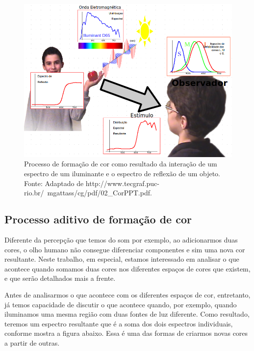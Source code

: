 \begin{figure}[!htb]
     \centering
     \includegraphics[scale=0.9]{img/what_is_color.png}
     \caption{Processo de formação de cor como resultado da interação de um
espectro de um iluminante e o espectro de reflexão de um objeto. Fonte:
Adaptado de 
{http://www.tecgraf.puc-rio.br/~mgattass/cg/pdf/02_CorPPT.pdf}.}
     \label{fig:what_is_color}
\end{figure}

\subsection{Processo aditivo de formação de cor}
\par
Diferente da percepção que temos do som por exemplo, ao adicionarmos duas cores,
o olho humano não consegue diferenciar componentes e sim uma nova cor
resultante. Neste trabalho, em especial, estamos interessado em analisar o que
acontece quando somamos duas cores nos diferentes espaços de cores que existem,
e que serão detalhados mais a frente.

\par
Antes de analisarmos o que acontece com os diferentes espaços de cor,
entretanto, já temos capacidade de discutir o que acontece quando, por exemplo,
quando iluminamos uma mesma região com duas fontes de luz diferente. Como
resultado, teremos um espectro resultante que é a soma dos dois espectros
individuais, conforme mostra a figura abaixo. Essa é uma das formas de criarmos
novas cores a partir de outras.

